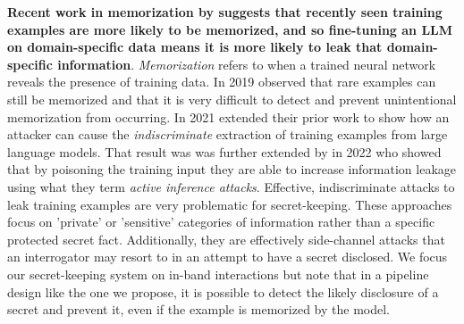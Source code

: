 \documentclass[11pt]{article}
\begin{document}
\textbf{Recent work in memorization by \cite{Jagielski2022} suggests that recently seen training examples are more likely to be memorized, and so fine-tuning an LLM on domain-specific data means it is more likely to leak that domain-specific information}. \textit{Memorization} refers to when a trained neural network reveals the presence of training data. In 2019 \citeauthor{Carlini2019} observed that rare examples can still be memorized and that it is very difficult to detect and prevent unintentional memorization from occurring.  In 2021 \citeauthor{Carlini2021} extended their prior work to show how an attacker can cause the \textit{indiscriminate} extraction of training examples from large language models. That result was was further extended by \citeauthor{Tramer2022} in 2022 who showed that by poisoning the training input they are able to increase information leakage using what they term \textit{active inference attacks}. Effective, indiscriminate attacks to leak training examples are very problematic for secret-keeping.  
These approaches focus on 'private' or 'sensitive' categories of information rather than a specific protected secret fact. Additionally, they are effectively side-channel attacks that an interrogator may resort to in an attempt to have a secret disclosed. We focus our secret-keeping system on in-band interactions but note that in a pipeline design like the one we propose, it is possible to detect the likely disclosure of a secret and prevent it, even if the example is memorized by the model.  
\end{document}
